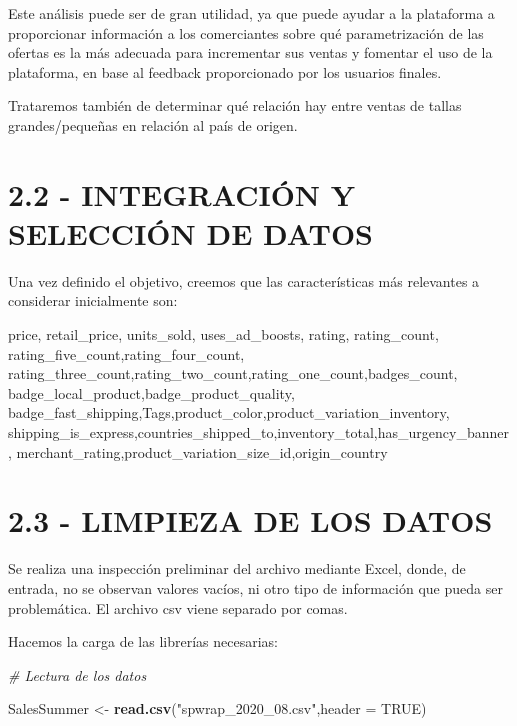 \documentclass[
]{article}
\newenvironment{Shaded}{\begin{snugshade}}{\end{snugshade}}
\newcommand{\CommentTok}[1]{\textcolor[rgb]{0.56,0.35,0.01}{\textit{#1}}}
\newcommand{\DataTypeTok}[1]{\textcolor[rgb]{0.13,0.29,0.53}{#1}}
\newcommand{\KeywordTok}[1]{\textcolor[rgb]{0.13,0.29,0.53}{\textbf{#1}}}
\newcommand{\NormalTok}[1]{#1}
\newcommand{\OtherTok}[1]{\textcolor[rgb]{0.56,0.35,0.01}{#1}}
\newcommand{\StringTok}[1]{\textcolor[rgb]{0.31,0.60,0.02}{#1}}
\begin{document}
Este análisis puede ser de gran utilidad, ya que puede ayudar a la
plataforma a proporcionar información a los comerciantes sobre qué
parametrización de las ofertas es la más adecuada para incrementar sus
ventas y fomentar el uso de la plataforma, en base al feedback
proporcionado por los usuarios finales.

Trataremos también de determinar qué relación hay entre ventas de tallas
grandes/pequeñas en relación al país de origen.

\hypertarget{integraciuxf3n-y-selecciuxf3n-de-datos}{%
\section{2.2 - INTEGRACIÓN Y SELECCIÓN DE
DATOS}\label{integraciuxf3n-y-selecciuxf3n-de-datos}}

Una vez definido el objetivo, creemos que las características más
relevantes a considerar inicialmente son:

price, retail\_price, units\_sold, uses\_ad\_boosts, rating,
rating\_count, rating\_five\_count,rating\_four\_count,
rating\_three\_count,rating\_two\_count,rating\_one\_count,badges\_count,
badge\_local\_product,badge\_product\_quality,
badge\_fast\_shipping,Tags,product\_color,product\_variation\_inventory,
shipping\_is\_express,countries\_shipped\_to,inventory\_total,has\_urgency\_banner,
merchant\_rating,product\_variation\_size\_id,origin\_country

\hypertarget{limpieza-de-los-datos}{%
\section{2.3 - LIMPIEZA DE LOS DATOS}\label{limpieza-de-los-datos}}

Se realiza una inspección preliminar del archivo mediante Excel, donde,
de entrada, no se observan valores vacíos, ni otro tipo de información
que pueda ser problemática. El archivo csv viene separado por comas.

Hacemos la carga de las librerías necesarias:

\begin{Shaded}
\begin{Highlighting}[]
\CommentTok{# Lectura de los datos}

\NormalTok{SalesSummer <-}\StringTok{ }\KeywordTok{read.csv}\NormalTok{(}\StringTok{"spwrap_2020_08.csv"}\NormalTok{,}\DataTypeTok{header =} \OtherTok{TRUE}\NormalTok{)}
\end{Highlighting}
\end{Shaded}
\end{document}
